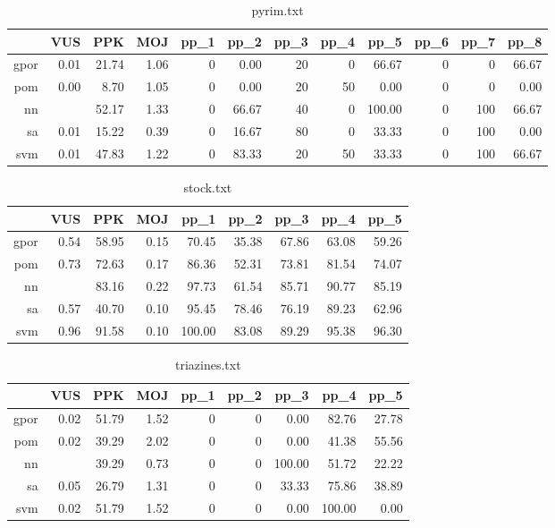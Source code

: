 \documentclass[10pt,a4paper]{article}
\begin{document}
\begin{table}[ht]
\centering
\begin{tabular}{rrrrrrrrrrrr}
  \hline
 & VUS & PPK & MOJ & pp\_1 & pp\_2 & pp\_3 & pp\_4 & pp\_5 & pp\_6 & pp\_7 & pp\_8 \\ 
  \hline
gpor & 0.01 & 21.74 & 1.06 &   0 & 0.00 &  20 &   0 & 66.67 &   0 &   0 & 66.67 \\ 
  pom & 0.00 & 8.70 & 1.05 &   0 & 0.00 &  20 &  50 & 0.00 &   0 &   0 & 0.00 \\ 
  nn &  & 52.17 & 1.33 &   0 & 66.67 &  40 &   0 & 100.00 &   0 & 100 & 66.67 \\ 
  sa & 0.01 & 15.22 & 0.39 &   0 & 16.67 &  80 &   0 & 33.33 &   0 & 100 & 0.00 \\ 
  svm & 0.01 & 47.83 & 1.22 &   0 & 83.33 &  20 &  50 & 33.33 &   0 & 100 & 66.67 \\ 
   \hline
\end{tabular}
\caption{pyrim.txt} 
\end{table}
\begin{table}[ht]
\centering
\begin{tabular}{rrrrrrrrr}
  \hline
 & VUS & PPK & MOJ & pp\_1 & pp\_2 & pp\_3 & pp\_4 & pp\_5 \\ 
  \hline
gpor & 0.54 & 58.95 & 0.15 & 70.45 & 35.38 & 67.86 & 63.08 & 59.26 \\ 
  pom & 0.73 & 72.63 & 0.17 & 86.36 & 52.31 & 73.81 & 81.54 & 74.07 \\ 
  nn &  & 83.16 & 0.22 & 97.73 & 61.54 & 85.71 & 90.77 & 85.19 \\ 
  sa & 0.57 & 40.70 & 0.10 & 95.45 & 78.46 & 76.19 & 89.23 & 62.96 \\ 
  svm & 0.96 & 91.58 & 0.10 & 100.00 & 83.08 & 89.29 & 95.38 & 96.30 \\ 
   \hline
\end{tabular}
\caption{stock.txt} 
\end{table}
\begin{table}[ht]
\centering
\begin{tabular}{rrrrrrrrr}
  \hline
 & VUS & PPK & MOJ & pp\_1 & pp\_2 & pp\_3 & pp\_4 & pp\_5 \\ 
  \hline
gpor & 0.02 & 51.79 & 1.52 &   0 &   0 & 0.00 & 82.76 & 27.78 \\ 
  pom & 0.02 & 39.29 & 2.02 &   0 &   0 & 0.00 & 41.38 & 55.56 \\ 
  nn &  & 39.29 & 0.73 &   0 &   0 & 100.00 & 51.72 & 22.22 \\ 
  sa & 0.05 & 26.79 & 1.31 &   0 &   0 & 33.33 & 75.86 & 38.89 \\ 
  svm & 0.02 & 51.79 & 1.52 &   0 &   0 & 0.00 & 100.00 & 0.00 \\ 
   \hline
\end{tabular}
\caption{triazines.txt} 
\end{table}
\end{document}
